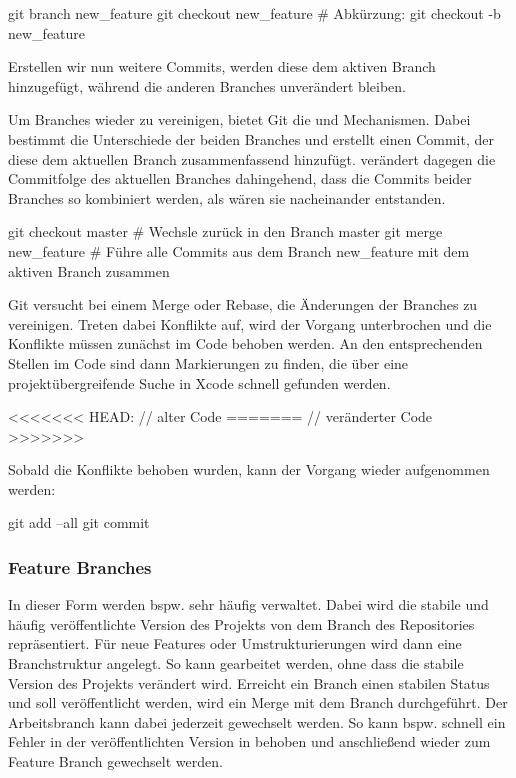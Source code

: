 \documentclass[parskip=half, final]{scrreprt}
\begin{document}
\begin{shlst}
git branch new_feature
git checkout new_feature
# Abkürzung:
git checkout -b new_feature
\end{shlst}

Erstellen wir nun weitere Commits, werden diese dem aktiven Branch hinzugefügt, während die anderen Branches unverändert bleiben. 

Um Branches wieder zu vereinigen, bietet Git die  und  Mechanismen. Dabei bestimmt  die Unterschiede der beiden Branches und erstellt einen Commit, der diese dem aktuellen Branch zusammenfassend hinzufügt.  verändert dagegen die Commitfolge des aktuellen Branches dahingehend, dass die Commits beider Branches so kombiniert werden, als wären sie nacheinander entstanden.

\begin{shlst}
git checkout master # Wechsle zurück in den Branch master
git merge new_feature # Führe alle Commits aus dem Branch new_feature mit dem aktiven Branch zusammen
\end{shlst}

Git versucht bei einem Merge oder Rebase, die Änderungen der Branches zu vereinigen. Treten dabei Konflikte auf, wird der Vorgang unterbrochen und die Konflikte müssen zunächst im Code behoben werden. An den entsprechenden Stellen im Code sind dann Markierungen zu finden, die über eine projektübergreifende Suche in Xcode schnell gefunden werden.

\begin{objclst}
<<<<<<< HEAD:
// alter Code
=======
// veränderter Code
>>>>>>>
\end{objclst}

Sobald die Konflikte behoben wurden, kann der Vorgang wieder aufgenommen werden:

\begin{shlst}
git add --all
git commit
\end{shlst}

\subsubsection{Feature Branches}

In dieser Form werden bspw. sehr häufig  verwaltet. Dabei wird die stabile und häufig veröffentlichte Version des Projekts von dem  Branch des Repositories repräsentiert. Für neue Features oder Umstrukturierungen wird dann eine Branchstruktur angelegt. So kann gearbeitet werden, ohne dass die stabile Version des Projekts verändert wird. Erreicht ein Branch einen stabilen Status und soll veröffentlicht werden, wird ein Merge mit dem  Branch durchgeführt. Der Arbeitsbranch kann dabei jederzeit gewechselt werden. So kann bspw. schnell ein Fehler in der veröffentlichten Version in  behoben und anschließend wieder zum Feature Branch gewechselt werden.
\end{document}
